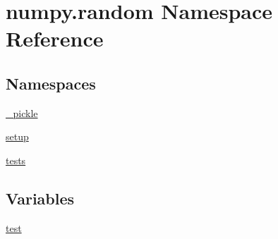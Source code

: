 \hypertarget{namespacenumpy_1_1random}{}\section{numpy.\+random Namespace Reference}
\label{namespacenumpy_1_1random}
\subsection*{Namespaces}
\begin{DoxyCompactItemize}
\item 
 \hyperlink{namespacenumpy_1_1random_1_1__pickle}{\+\_\+pickle}
\item 
 \hyperlink{namespacenumpy_1_1random_1_1setup}{setup}
\item 
 \hyperlink{namespacenumpy_1_1random_1_1tests}{tests}
\end{DoxyCompactItemize}
\subsection*{Variables}
\begin{DoxyCompactItemize}
\item 
\hyperlink{namespacenumpy_1_1random_a41387850fe19531cd12964fe00630cce}{test}
\end{DoxyCompactItemize}


